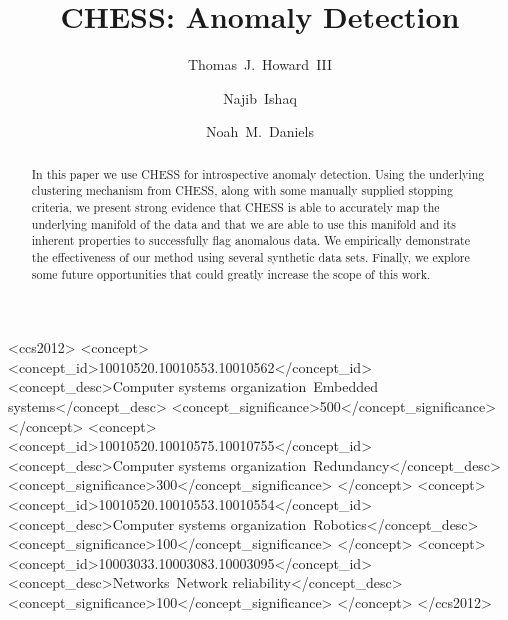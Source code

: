 \documentclass[sigconf]{acmart}
\begin{document}
\title{CHESS: Anomaly Detection}

\author{Thomas~J.~Howard~III}

\author{Najib~Ishaq}
\authornotemark[1]

\author{Noah~M.~Daniels}

\renewcommand{\shortauthors}{Howard and Ishaq, et al.}

\begin{abstract}
In this paper we use CHESS for introspective anomaly detection.
Using the underlying clustering mechanism from CHESS, along with some manually supplied stopping criteria, we present strong evidence that CHESS is able to accurately map the underlying manifold of the data and that we are able to use this manifold and its inherent properties to successfully flag anomalous data.
We empirically demonstrate the effectiveness of our method using several synthetic data sets.
Finally, we explore some future opportunities that could greatly increase the scope of this work.
\end{abstract}

\begin{CCSXML}
<ccs2012>
 <concept>
  <concept_id>10010520.10010553.10010562</concept_id>
  <concept_desc>Computer systems organization~Embedded systems</concept_desc>
  <concept_significance>500</concept_significance>
 </concept>
 <concept>
  <concept_id>10010520.10010575.10010755</concept_id>
  <concept_desc>Computer systems organization~Redundancy</concept_desc>
  <concept_significance>300</concept_significance>
 </concept>
 <concept>
  <concept_id>10010520.10010553.10010554</concept_id>
  <concept_desc>Computer systems organization~Robotics</concept_desc>
  <concept_significance>100</concept_significance>
 </concept>
 <concept>
  <concept_id>10003033.10003083.10003095</concept_id>
  <concept_desc>Networks~Network reliability</concept_desc>
  <concept_significance>100</concept_significance>
 </concept>
</ccs2012>
\end{CCSXML}
\end{document}
